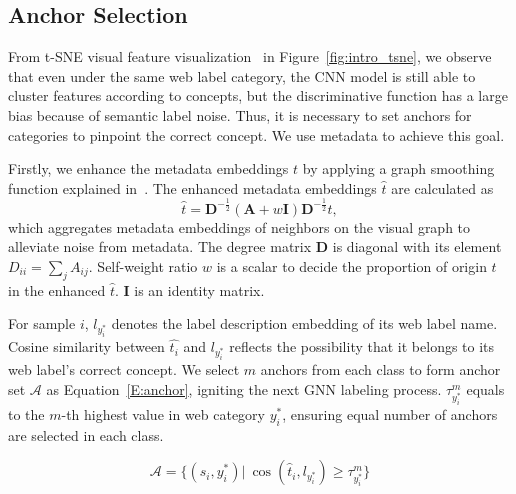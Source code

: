 \documentclass[sigconf]{acmart}
\begin{document}
\subsection{Anchor Selection}
	\label{S:anchor}
	From t-SNE visual feature visualization~\cite{maaten2008visualizing} in Figure~\ref{fig:intro_tsne}, we observe that even under the same web label category, the CNN model is still able to cluster features according to concepts, but the discriminative function has a large bias because of semantic label noise. Thus, it is necessary to set anchors for categories to pinpoint the correct concept. We use metadata to achieve this goal.
	
	Firstly, we enhance the metadata embeddings $t$ by applying a graph smoothing function explained in~\cite{kipf2016gcn}. The enhanced metadata embeddings $\hat{t}$ are calculated as
	\begin{equation}
	\label{E:enhanced_text}
	\hat{t}=\mathbf{D}^{-\frac{1}{2}}(\mathbf{A}+w\mathbf{I})\mathbf{D}^{-\frac{1}{2}}t,
	\end{equation}
	which aggregates metadata embeddings of neighbors on the visual graph to alleviate noise from metadata. The degree matrix $\textbf{D}$ is diagonal with its element $D_{ii}=\sum_{j}A_{ij}$. Self-weight ratio $w$ is a scalar to decide the proportion of origin $t$ in the enhanced $\hat{t}$. $\textbf{I}$ is an identity matrix.
	
	For sample $i$, $l_{y^*_i}$ denotes the label description embedding of its web label name. Cosine similarity between $\hat{t_i}$ and $l_{y^*_i}$ reflects the possibility that it belongs to its web label's correct concept.
	We select $m$ anchors from each class to form anchor set $\mathcal{A}$ as Equation~\ref{E:anchor}, igniting the next GNN labeling process. $\tau_{y^*_i}^m$ equals to the $m$-th highest value in web category $y^*_i$, ensuring equal number of anchors are selected in each class.
	
	\begin{equation}
	\label{E:anchor}
	\mathcal{A}=\Big\lbrace\left(  s_i, y^*_i \right)  \Big| ~ \cos\left(\hat{t}_i, l_{y^*_i} \right) \ge \tau_{y^*_i}^m  \Big\rbrace
	\end{equation}
	
\end{document}

